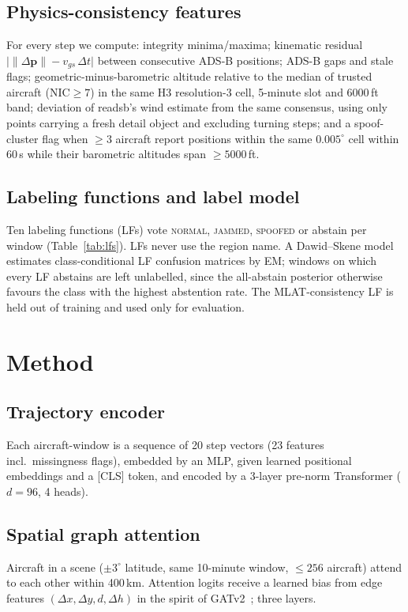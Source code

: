 \documentclass[conference]{IEEEtran}
\begin{document}
\subsection{Physics-consistency features}
For every step we compute: integrity minima/maxima; kinematic residual
$\lvert \lVert \Delta \mathbf{p} \rVert - v_{gs}\,\Delta t \rvert$ between consecutive ADS-B positions;
ADS-B gaps and stale flags; geometric-minus-barometric altitude relative to the median of trusted aircraft
($\mathrm{NIC}\ge7$) in the same H3 resolution-3 cell, 5-minute slot and 6000\,ft band; deviation of
readsb's wind estimate from the same consensus, using only points carrying a fresh detail object and
excluding turning steps; and a spoof-cluster flag when $\ge3$ aircraft report positions within the same
$0.005^\circ$ cell within 60\,s while their barometric altitudes span $\ge5000$\,ft.

\subsection{Labeling functions and label model}
Ten labeling functions (LFs) vote \textsc{normal}, \textsc{jammed}, \textsc{spoofed} or abstain per window
(Table~\ref{tab:lfs}). LFs never use the region name. A Dawid--Skene model estimates class-conditional LF
confusion matrices by EM; windows on which every LF abstains are left unlabelled, since the all-abstain
posterior otherwise favours the class with the highest abstention rate. The MLAT-consistency LF is held
out of training and used only for evaluation.



\section{Method}
\subsection{Trajectory encoder}
Each aircraft-window is a sequence of 20 step vectors (23 features incl.\ missingness flags), embedded by
an MLP, given learned positional embeddings and a [CLS] token, and encoded by a 3-layer pre-norm
Transformer ($d=96$, 4 heads).
\subsection{Spatial graph attention}
Aircraft in a scene ($\pm3^\circ$ latitude, same 10-minute window, $\le256$ aircraft) attend to each other
within 400\,km. Attention logits receive a learned bias from edge features
$(\Delta x, \Delta y, d, \Delta h)$ in the spirit of GATv2~\cite{brody2022gatv2}; three layers.
\end{document}
